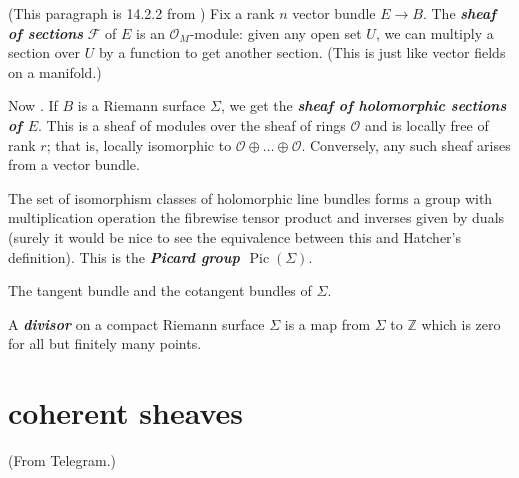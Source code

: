 \documentclass{article}
\newcommand{\Z}{\mathbb{Z}}
\newcommand{\Fc}{\mathcal{F}}
\newcommand{\Oc}{\mathcal{O}}
\DeclareMathOperator{\Pic}{Pic}
\begin{document}
\begin{remark}
	(This paragraph is 14.2.2 from \cite{the-rising-sea}) Fix a rank $n$ vector bundle $E\to B$. The \textbf{\textit{sheaf of sections}} $\Fc$ of $E$ is an $\Oc_M$-module: given any open set $U$, we can multiply a section over $U$ by a function to get another section. {\color{cyan}(This is just like vector fields on a manifold.)}
	
	Now \cite{donaldson}. If $B$ is a Riemann surface $\Sigma$, we get the \textbf{\textit{sheaf of holomorphic sections of $E$}}. This is a sheaf of modules over the sheaf of rings $\Oc$ and is locally free of rank $r$; that is, locally isomorphic to $\Oc\oplus\ldots\oplus\Oc$. Conversely, any such sheaf arises from a vector bundle.
\end{remark}
\begin{defn}
	The set of isomorphism classes of holomorphic line bundles forms a group with multiplication operation the fibrewise tensor product and {\color{magenta}inverses given by duals (surely it would be nice to see the equivalence between this and Hatcher's definition)}. This is the \textbf{\textit{Picard group $\Pic(\Sigma)$}}.
\end{defn}
\begin{example}
	The tangent bundle and the cotangent bundles of $\Sigma$.
\end{example}
\begin{defn}
	A \textbf{\textit{divisor}} on a compact Riemann surface $\Sigma$ is a map from $\Sigma$ to $\Z$ which is zero for all but finitely many points.
\end{defn}
	
\section{coherent sheaves}

(From Telegram.)
\end{document}
